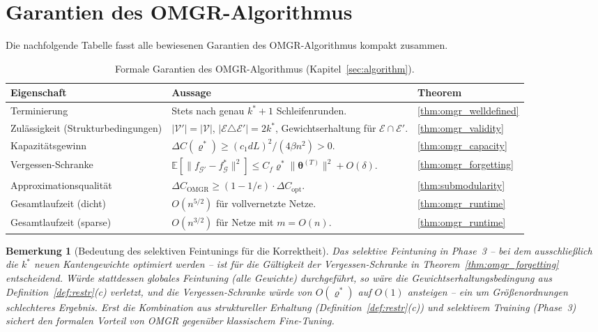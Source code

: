 ﻿\documentclass[12pt, a4paper, openany]{report}
\newtheorem{remark}[theorem]{Bemerkung}
\newcommand{\E}{\mathbb{E}}
\newcommand{\calG}{\mathcal{G}}
\newcommand{\calV}{\mathcal{V}}
\newcommand{\calE}{\mathcal{E}}
\begin{document}
\section{Garantien des OMGR-Algorithmus}
\label{sec:algo_summary}

Die nachfolgende Tabelle fasst alle bewiesenen Garantien des OMGR-Algorithmus
kompakt zusammen.

\begin{table}[H]
\centering
\caption{Formale Garantien des OMGR-Algorithmus (Kapitel~\ref{sec:algorithm}).}
\label{tab:omgr_guarantees}
\renewcommand{\arraystretch}{1.35}
\begin{tabularx}{\linewidth}{@{}l X l@{}}
\toprule
\textbf{Eigenschaft} & \textbf{Aussage} & \textbf{Theorem} \\
\midrule
Terminierung
  & Stets nach genau $k^* + 1$ Schleifenrunden.
  & \ref{thm:omgr_welldefined} \\
Zulässigkeit (Strukturbedingungen)
  & $|\calV'|=|\calV|$, $|\calE\triangle\calE'|=2k^*$,
    Gewichtserhaltung für $\calE\cap\calE'$.
  & \ref{thm:omgr_validity} \\
Kapazitätsgewinn
  & $\Delta C(\varrho^*) \geq (c_1 dL)^2/(4\beta n^2) > 0$.
  & \ref{thm:omgr_capacity} \\
Vergessen-Schranke
  & $\E[\|f_{\calG'}-f^*_\calG\|^2] \leq C_f\varrho^*\|\bm\theta^{(T)}\|^2+O(\delta)$.
  & \ref{thm:omgr_forgetting} \\
Approximationsqualität
  & $\Delta C_{\mathrm{OMGR}} \geq (1-1/e)\cdot\Delta C_{\mathrm{opt}}$.
  & \ref{thm:submodularity} \\
Gesamtlaufzeit (dicht)
  & $O(n^{5/2})$ für vollvernetzte Netze.
  & \ref{thm:omgr_runtime} \\
Gesamtlaufzeit (sparse)
  & $O(n^{3/2})$ für Netze mit $m = O(n)$.
  & \ref{thm:omgr_runtime} \\
\bottomrule
\end{tabularx}
\end{table}

\begin{remark}[Bedeutung des selektiven Feintunings für die Korrektheit]
\label{rem:selective_finetuning}
Das selektive Feintuning in Phase~3 -- bei dem ausschließlich die $k^*$
neuen Kantengewichte optimiert werden -- ist für die Gültigkeit der
Vergessen-Schranke in Theorem~\ref{thm:omgr_forgetting} \emph{entscheidend}.
Würde stattdessen globales Feintuning (alle Gewichte) durchgeführt,
so wäre die Gewichtserhaltungsbedingung aus Definition~\ref{def:restr}(c)
verletzt, und die Vergessen-Schranke würde von $O(\varrho^*)$ auf $O(1)$
ansteigen -- ein um Größenordnungen schlechteres Ergebnis.  Erst die
Kombination aus struktureller Erhaltung (Definition~\ref{def:restr}(c))
und selektivem Training (Phase~3) sichert den formalen Vorteil von OMGR
gegenüber klassischem Fine-Tuning.
\end{remark}
\end{document}
